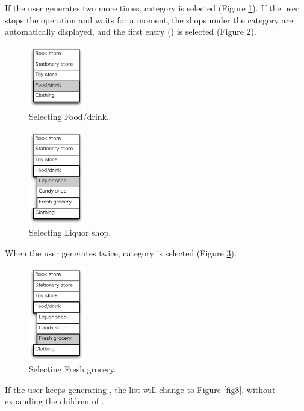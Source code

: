 \documentclass{article}
\begin{document}
If the user generates {\D} two more times, 
 category is selected (Figure \ref{fig4}).
If the user stops the operation and waits for a moment, the shops under the 
category are automatically displayed,
and the first entry () is selected (Figure \ref{fig5}).

\begin{figure}[H]
\centerline{\includegraphics[width=24mm,bb=0 0 139 157]{figures/fig4.pdf}}
\caption{Selecting Food/drink.}
\label{fig4}
\end{figure}

\begin{figure}[H]
\centerline{\includegraphics[width=24mm,bb=0 0 139 238]{figures/fig5.pdf}}
\caption{Selecting Liquor shop.}
\label{fig5}
\end{figure}

When the user generates {\D} twice,
 category is selected (Figure \ref{fig6}).

\begin{figure}[H]
\centerline{\includegraphics[width=24mm,bb=0 0 139 238]{figures/fig6.pdf}}
\caption{Selecting Fresh grocery.}
\label{fig6}
\end{figure}

If the user keeps generating {\D}, 
the list will change to Figure \ref{fig8},
without expanding the children of .
\end{document}

